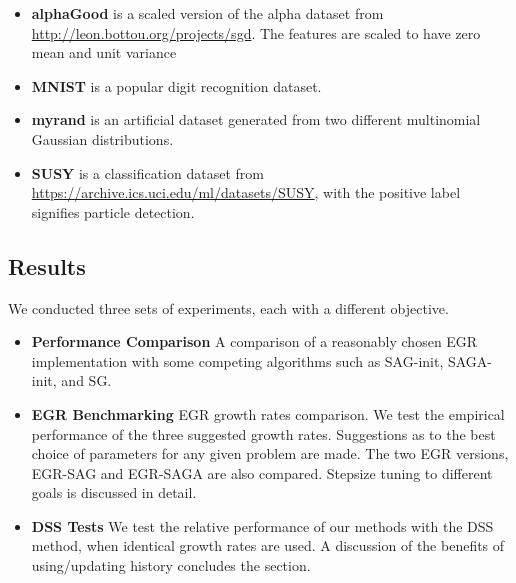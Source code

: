 \documentclass[11pt]{article}
\begin{document}
\begin{itemize}
	\item \textbf{alphaGood} is a scaled version of the alpha dataset from \url{http://leon.bottou.org/projects/sgd}. The features are scaled to have zero mean and unit variance
	\item \textbf{MNIST} is a popular digit recognition dataset.
	\item \textbf{myrand} is an artificial dataset generated from two different multinomial Gaussian distributions. 
	\item  \textbf{SUSY} is a classification dataset from \url{https://archive.ics.uci.edu/ml/datasets/SUSY}, with the positive label signifies particle detection. 
\end{itemize}





   
  
   
   \subsection{Results}

   We conducted three sets of experiments, each with a different objective. 
   \begin{itemize}
   	\item \textbf{Performance Comparison} A comparison of a reasonably chosen EGR implementation with some competing algorithms such as SAG-init, SAGA-init, and SG.
    \item \textbf{EGR Benchmarking} EGR growth rates comparison. We test the empirical performance of the three suggested growth rates. Suggestions as to the best choice of parameters for any given problem are made. The two EGR versions, EGR-SAG and EGR-SAGA are also compared. Stepsize tuning to different goals is discussed in detail.  
    \item \textbf{DSS Tests} We test the relative performance of our methods with the DSS method, when identical growth rates are used. A discussion of the benefits of using/updating history concludes the section.
   \end{itemize}
   
\end{document}
